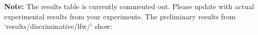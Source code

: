 \documentclass[12pt,a4paper]{article}
\begin{document}

\textbf{Note:} The results table is currently commented out. Please update with actual experimental results from your experiments. The preliminary results from `results/discriminative/lfw/` show:
\end{document}
